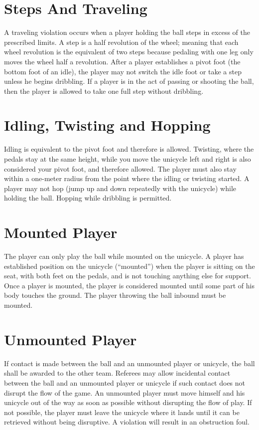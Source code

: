 \section{Steps And Traveling}
A traveling violation occurs when a player holding the ball steps in excess of the prescribed limits.
A step is a half revolution of the wheel; meaning that each wheel revolution is the equivalent of two steps because pedaling with one leg only moves the wheel half a revolution.
After a player establishes a pivot foot (the bottom foot of an idle), the player may not switch the idle foot or take a step unless he begins dribbling.
If a player is in the act of passing or shooting the ball, then the player is allowed to take one full step without dribbling.

\section{Idling, Twisting and Hopping}
Idling is equivalent to the pivot foot and therefore is allowed.
Twisting, where the pedals stay at the same height, while you move the unicycle left and right is also considered your pivot foot, and therefore allowed.
The player must also stay within a one-meter radius from the point where the idling or twisting started.
A player may not hop (jump up and down repeatedly with the unicycle) while holding the ball.
Hopping while dribbling is permitted.

\section{Mounted Player}
The player can only play the ball while mounted on the unicycle.
A player has established position on the unicycle (``mounted'') when the player is sitting on the seat, with both feet on the pedals, and is not touching anything else for support.
Once a player is mounted, the player is considered mounted until some part of his body touches the ground.
The player throwing the ball inbound must be mounted.

\section{Unmounted Player}
If contact is made between the ball and an unmounted player or unicycle, the ball shall be awarded to the other team.
Referees may allow incidental contact between the ball and an unmounted player or unicycle if such contact does not disrupt the flow of the game.
An unmounted player must move himself and his unicycle out of the way as soon as possible
without disrupting the flow of play.
If not possible, the player must leave the unicycle where it lands until it can be retrieved without being disruptive.
A violation will result in an obstruction foul.

